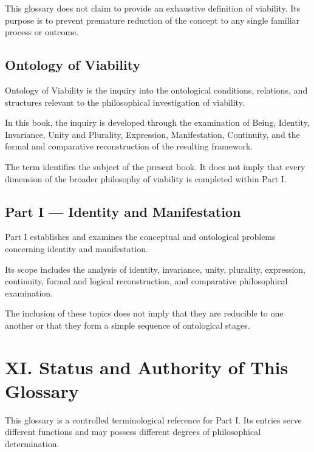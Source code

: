 This glossary does not claim to provide an exhaustive definition
of viability. Its purpose is to prevent premature reduction of
the concept to any single familiar process or outcome.


\subsection*{Ontology of Viability}

Ontology of Viability is the inquiry into the ontological conditions,
relations, and structures relevant to the philosophical investigation
of viability.

In this book, the inquiry is developed through the examination
of Being, Identity, Invariance, Unity and Plurality, Expression,
Manifestation, Continuity, and the formal and comparative
reconstruction of the resulting framework.

The term identifies the subject of the present book. It does not
imply that every dimension of the broader philosophy of viability
is completed within Part I.


\subsection*{Part I — Identity and Manifestation}

Part I establishes and examines the conceptual and ontological
problems concerning identity and manifestation.

Its scope includes the analysis of identity, invariance, unity,
plurality, expression, continuity, formal and logical reconstruction,
and comparative philosophical examination.

The inclusion of these topics does not imply that they are reducible
to one another or that they form a simple sequence of ontological
stages.



\section*{XI. Status and Authority of This Glossary}


This glossary is a controlled terminological reference for Part I.
Its entries serve different functions and may possess different
degrees of philosophical determination.

